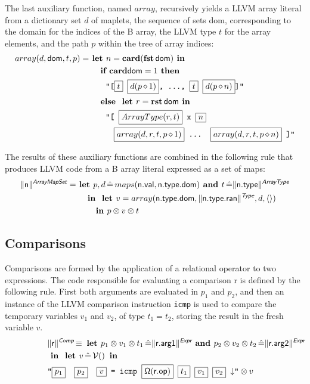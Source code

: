 \documentclass{article}
\newcommand{\trad}[2]{\ensuremath{\lVert \textsf{#1} \rVert^{\textit{#2}}}}
\newcommand{\nl}[0]{\ensuremath{\downarrow}}
\DeclareMathOperator{\conc}{\diamond}
\DeclareMathOperator{\isdef}{\equiv}
\DeclareMathOperator{\variable}{\mathcal{V}()}
\newcommand{\llvm}[1]{\texttt{#1}}
\newcommand{\B}[1]{\textsf{#1}}
\newcommand{\IF}[0]{\textbf{ if }}
\newcommand{\ELSE}[0]{\textbf{ else }}
\newcommand{\THEN}[0]{\textbf{ then }}
\newcommand{\LET}[0]{\textbf{ let }}
\DeclareMathOperator{\BE}{\hat{=}}
\newcommand{\IN}[0]{\textbf{ in }}
\newcommand{\AND}[0]{\textbf{ and }}
\newcommand{\PH}[1]{\framebox{$#1$}}
\newcommand{\sep}[0]{\otimes}
\newcommand{\opmap}[0]{\ensuremath{\sf\Omega}}
\begin{document}
The last auxiliary function, named $array$, recursively yields a LLVM
array literal from a dictionary set $d$ of maplets, the sequence of
sets \B{dom}, corresponding to the domain for the indices of the B
array, the LLVM type $t$ for the array elements, and the path $p$ within
the tree of array indices:
\begin{align*}
array(d, \B{dom}, t, p) =& 
\LET n = \card(\fst\, \B{dom}) \IN \\
&\quad
\IF \card \B{dom} = 1\THEN \\
& \quad \quad
\llvm{"[\PH{t} \PH{d(p \conc 1)}, ..., \PH{t} \PH{d(p \conc n)}]"} \\
&\quad \ELSE \LET r = \rst\, \B{dom} \IN \\
&\quad \quad \llvm{"[ \PH{ArrayType(r, t)} x \PH{n}} \\
&\quad \quad \quad \llvm{\PH{array(d, r, t, p \conc 1)} ... \PH{array(d, r, t, p \conc n)} ]"}
\end{align*}

The results of these auxiliary functions are combined in the following
rule that produces LLVM code from a B array literal expressed as a set
of maps:
\begin{align*}
\trad{n}{\B{ArrayMapSet}} =& 
\LET p, d \BE maps(\B{n.val}, \B{n.type.dom}) \AND
t \BE \trad{n.type}{\B{ArrayType}}\\
& \quad \IN \LET v = array(\B{n.type.dom}, \trad{n.type.ran}{\B{Type}}, d, \langle \rangle) \\
& \quad \quad \IN p \sep v \sep t
\end{align*}

\subsection{Comparisons}

Comparisons are formed by the application of a relational operator to
two expressions. The code responsible for evaluating a comparison
\B{r} is defined by the following rule. First both arguments are
evaluated in $p_1$ and $p_2$, and then an instance of the LLVM
comparison instruction \llvm{icmp} is used to compare the temporary
variables $v_1$ and $v_2$, of type $t_1 = t_2$, storing the result in
the fresh variable $v$.
\begin{align*}
\lefteqn{\trad{r}{\B{Comp}} \isdef
  \LET
  p_1 \sep v_1 \sep t_1 \BE \trad{r.arg1}{\B{Expr}} \AND
  p_2 \sep v_2 \sep t_2 \BE \trad{r.arg2}{\B{Expr}}} \\
& \IN \LET v \BE \variable \IN \\
& \llvm{"\PH{p_1}\quad\PH{p_2}\quad\PH{v} = icmp \PH{\opmap(\B{r.op})} \PH{t_1} \PH{v_1} \PH{v_2} \nl"} \sep v
\end{align*}
\end{document}
